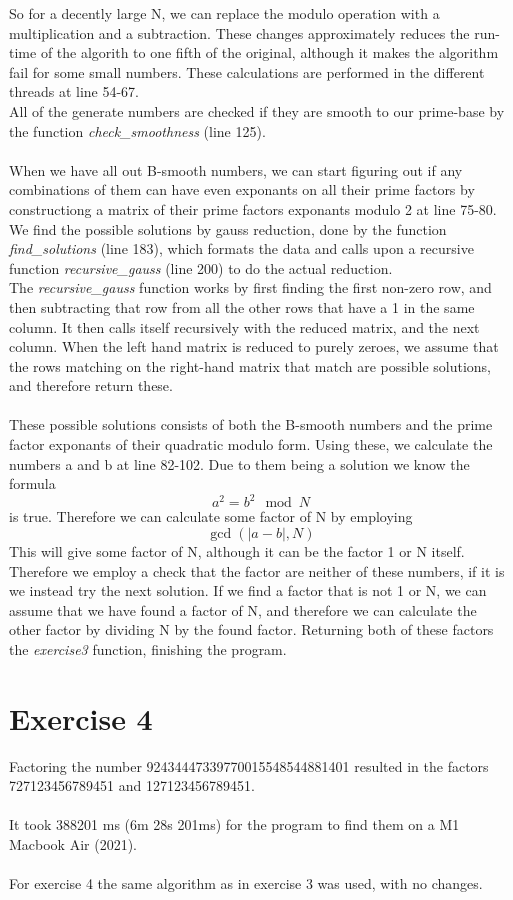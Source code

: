 \documentclass[12pt]{article}
\begin{document}
So for a decently large N, we can replace the modulo operation with a multiplication and a subtraction. These changes approximately reduces the run-time of the algorith to one fifth of the original, although it makes the algorithm fail for some small numbers. These calculations are performed in the different threads at line 54-67.
\\
All of the generate numbers are checked if they are smooth to our prime-base by the function \textit{check\_smoothness} (line 125).
\\\\
When we have all out B-smooth numbers, we can start figuring out if any combinations of them can have even exponants on all their prime factors by constructiong a matrix of their prime factors exponants modulo 2 at line 75-80.
We find the possible solutions by gauss reduction, done by the function \textit{find\_solutions} (line 183), which formats the data and calls upon a recursive function \textit{recursive\_gauss} (line 200) to do the actual reduction.
\\
The \textit{recursive\_gauss} function works by first finding the first non-zero row, and then subtracting that row from all the other rows that have a 1 in the same column. It then calls itself recursively with the reduced matrix, and the next column. When the left hand matrix is reduced to purely zeroes, we assume that the rows matching on the right-hand matrix that match are possible solutions, and therefore return these.
\\\\
These possible solutions consists of both the B-smooth numbers and the prime factor exponants of their quadratic modulo form. Using these, we calculate the numbers a and b at line 82-102. Due to them being a solution we know the formula \[a^2=b^2\mod N\] is true. Therefore we can calculate some factor of N by employing \[\gcd (|a-b|, N)\]
This will give some factor of N, although it can be the factor 1 or N itself. Therefore we employ a check that the factor are neither of these numbers, if it is we instead try the next solution. If we find a factor that is not 1 or N, we can assume that we have found a factor of N, and therefore we can calculate the other factor by dividing N by the found factor. Returning both of these factors the \textit{exercise3} function, finishing the program.

\section*{Exercise 4}
Factoring the number 92434447339770015548544881401 resulted in the factors \\
727123456789451 and 127123456789451.
\\\\
It took 388201 ms (6m 28s 201ms) for the program to find them on a M1 Macbook Air (2021).
\\\\
For exercise 4 the same algorithm as in exercise 3 was used, with no changes.
\end{document}
